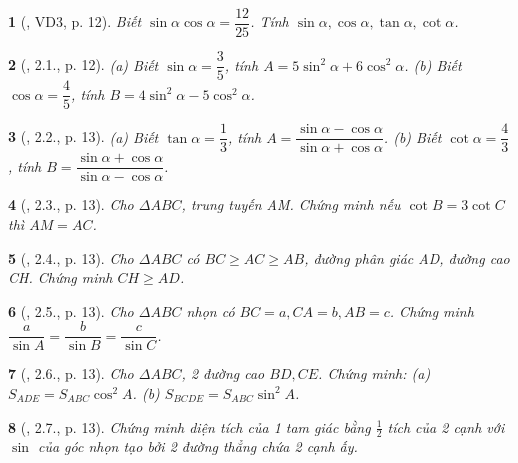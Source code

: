 \documentclass{article}
\newtheorem{baitoan}{}
\begin{document}
\begin{baitoan}[\cite{TLCT_THCS_Toan_9_hinh_hoc}, VD3, p. 12]
	Biết $\sin\alpha\cos\alpha = \dfrac{12}{25}$. Tính $\sin\alpha,\cos\alpha,\tan\alpha,\cot\alpha$.
\end{baitoan}

\begin{baitoan}[\cite{TLCT_THCS_Toan_9_hinh_hoc}, 2.1., p. 12]
	(a) Biết $\sin\alpha = \dfrac{3}{5}$, tính $A = 5\sin^2\alpha + 6\cos^2\alpha$. (b) Biết $\cos\alpha = \dfrac{4}{5}$, tính $B = 4\sin^2\alpha - 5\cos^2\alpha$.
\end{baitoan}

\begin{baitoan}[\cite{TLCT_THCS_Toan_9_hinh_hoc}, 2.2., p. 13]
	(a) Biết $\tan\alpha = \dfrac{1}{3}$, tính $A = \dfrac{\sin\alpha - \cos\alpha}{\sin\alpha + \cos\alpha}$. (b) Biết $\cot\alpha = \dfrac{4}{3}$, tính $B = \dfrac{\sin\alpha + \cos\alpha}{\sin\alpha - \cos\alpha}$.
\end{baitoan}

\begin{baitoan}[\cite{TLCT_THCS_Toan_9_hinh_hoc}, 2.3., p. 13]
	Cho $\Delta ABC$, trung tuyến AM. Chứng minh nếu $\cot B = 3\cot C$ thì $AM = AC$.
\end{baitoan}

\begin{baitoan}[\cite{TLCT_THCS_Toan_9_hinh_hoc}, 2.4., p. 13]
	Cho $\Delta ABC$ có $BC\ge AC\ge AB$, đường phân giác AD, đường cao CH. Chứng minh $CH\ge AD$.
\end{baitoan}

\begin{baitoan}[\cite{TLCT_THCS_Toan_9_hinh_hoc}, 2.5., p. 13]
	Cho $\Delta ABC$ nhọn có $BC = a,CA = b,AB = c$. Chứng minh $\dfrac{a}{\sin A} = \dfrac{b}{\sin B} = \dfrac{c}{\sin C}$.
\end{baitoan}

\begin{baitoan}[\cite{TLCT_THCS_Toan_9_hinh_hoc}, 2.6., p. 13]
	Cho $\Delta ABC$, 2 đường cao $BD,CE$. Chứng minh: (a) $S_{ADE} = S_{ABC}\cos^2A$. (b) $S_{BCDE} = S_{ABC}\sin^2A$.
\end{baitoan}

\begin{baitoan}[\cite{TLCT_THCS_Toan_9_hinh_hoc}, 2.7., p. 13]
	Chứng minh diện tích của 1 tam giác bằng $\frac{1}{2}$ tích của 2 cạnh với $\sin$ của góc nhọn tạo bởi 2 đường thẳng chứa 2 cạnh ấy.
\end{baitoan}
\end{document}
